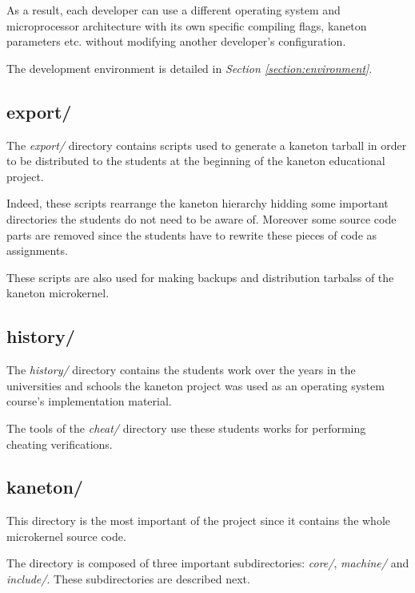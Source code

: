 As a result, each developer can use a different operating system and
microprocessor architecture with its own specific compiling flags, kaneton
parameters etc. without modifying another developer's configuration.

The development environment is detailed in \textit{Section
\ref{section:environment}}.

%
%

\subsection*{export/}

The \textit{export/} directory contains scripts used to generate a kaneton
tarball in order to be distributed to the students at the beginning of the
kaneton educational project.

Indeed, these scripts rearrange the kaneton hierarchy hidding some important
directories the students do not need to be aware of. Moreover some source
code parts are removed since the students have to rewrite these pieces
of code as assignments.

These scripts are also used for making backups and distribution tarbalss of
the kaneton microkernel.

%
%

\subsection*{history/}

The \textit{history/} directory contains the students work over the years
in the universities and schools the kaneton project was used as an operating
system course's implementation material.

The tools of the \textit{cheat/} directory use these students works for
performing cheating verifications.

%
%

\subsection*{kaneton/}

This directory is the most important of the project since it contains
the whole microkernel source code.

The directory is composed of three important subdirectories: \textit{core/},
\textit{machine/} and \textit{include/}. These subdirectories are described
next.



